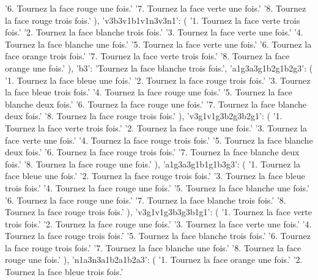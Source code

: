 {{            '6. Tournez la face rouge une fois.\n'
            '7. Tournez la face verte une fois.\n'
            '8. Tournez la face rouge trois fois.'
        ),
        'v3b3v1b1v1n3v3n1': (
            '1. Tournez la face verte trois fois.\n'
            '2. Tournez la face blanche trois fois.\n'
            '3. Tournez la face verte une fois.\n'
            '4. Tournez la face blanche une fois.\n'
            '5. Tournez la face verte une fois.\n'
            '6. Tournez la face orange trois fois.\n'
            '7. Tournez la face verte trois fois.\n'
            '8. Tournez la face orange une fois.'
        ),
        'b3': 'Tournez la face blanche trois fois.',
        'a1g3a3g1b2g1b2g3': (
            '1. Tournez la face bleue une fois.\n'
            '2. Tournez la face rouge trois fois.\n'
            '3. Tournez la face bleue trois fois.\n'
            '4. Tournez la face rouge une fois.\n'
            '5. Tournez la face blanche deux fois.\n'
            '6. Tournez la face rouge une fois.\n'
            '7. Tournez la face blanche deux fois.\n'
            '8. Tournez la face rouge trois fois.'
        ),
        'v3g1v1g3b2g3b2g1': (
            '1. Tournez la face verte trois fois.\n'
            '2. Tournez la face rouge une fois.\n'
            '3. Tournez la face verte une fois.\n'
            '4. Tournez la face rouge trois fois.\n'
            '5. Tournez la face blanche deux fois.\n'
            '6. Tournez la face rouge trois fois.\n'
            '7. Tournez la face blanche deux fois.\n'
            '8. Tournez la face rouge une fois.'
        ),
        'a1g3a3g1b1g1b3g3': (
            '1. Tournez la face bleue une fois.\n'
            '2. Tournez la face rouge trois fois.\n'
            '3. Tournez la face bleue trois fois.\n'
            '4. Tournez la face rouge une fois.\n'
            '5. Tournez la face blanche une fois.\n'
            '6. Tournez la face rouge une fois.\n'
            '7. Tournez la face blanche trois fois.\n'
            '8. Tournez la face rouge trois fois.'
        ),
        'v3g1v1g3b3g3b1g1': (
            '1. Tournez la face verte trois fois.\n'
            '2. Tournez la face rouge une fois.\n'
            '3. Tournez la face verte une fois.\n'
            '4. Tournez la face rouge trois fois.\n'
            '5. Tournez la face blanche trois fois.\n'
            '6. Tournez la face rouge trois fois.\n'
            '7. Tournez la face blanche une fois.\n'
            '8. Tournez la face rouge une fois.'
        ),
        'n1a3n3a1b2a1b2a3': (
            '1. Tournez la face orange une fois.\n'
            '2. Tournez la face bleue trois fois.\n'
}}
